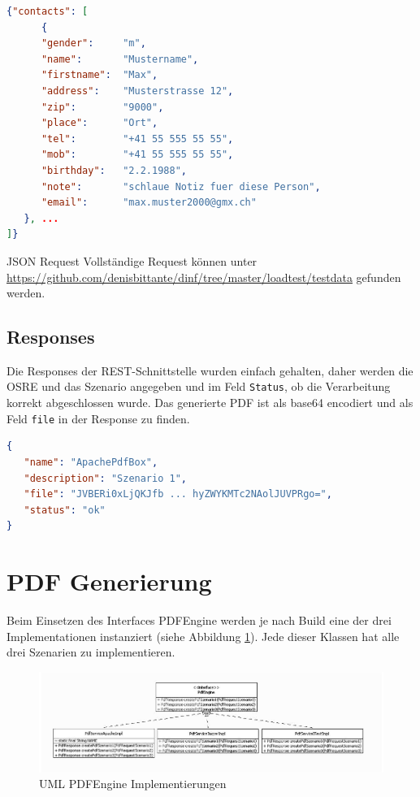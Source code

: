 \documentclass[main.tex]{subfiles}
\begin{document}
\begin{lstlisting}[language=json]
{"contacts": [
      {
      "gender":     "m",
      "name":       "Mustername",
      "firstname":  "Max",
      "address":    "Musterstrasse 12",
      "zip":        "9000",
      "place":      "Ort",
      "tel":        "+41 55 555 55 55",
      "mob":        "+41 55 555 55 55",
      "birthday":   "2.2.1988",
      "note":       "schlaue Notiz fuer diese Person",
      "email":      "max.muster2000@gmx.ch"
   }, ...
]}


\end{lstlisting}

\begin{reference}{JSON Request}
 Vollständige Request können unter \url{https://github.com/denisbittante/dinf/tree/master/loadtest/testdata} gefunden werden.
\end{reference}
 


\subsection{Responses}
Die Responses der REST-Schnittstelle wurden einfach gehalten, daher werden die OSRE und das Szenario angegeben und im Feld \texttt{Status}, ob die Verarbeitung korrekt abgeschlossen wurde. Das generierte PDF ist als base64 encodiert und als Feld \texttt{file} in der Response zu finden. 
\begin{lstlisting}[language=json]
{
   "name": "ApachePdfBox",
   "description": "Szenario 1",
   "file": "JVBERi0xLjQKJfb ... hyZWYKMTc2NAolJUVPRgo=",
   "status": "ok"
}

\end{lstlisting}




\section{PDF Generierung}

Beim Einsetzen des Interfaces PDFEngine werden je nach Build eine der drei Implementationen instanziert (siehe Abbildung \ref{figure:pdfEngineImpl}). Jede dieser Klassen hat alle drei Szenarien zu implementieren.  


\begin{figure}[h]
 
\includegraphics[width=\textwidth ]{pic/uml/PdfEngineImplemntierung.jpg}
 \caption{UML PDFEngine Implementierungen}
 \label{figure:pdfEngineImpl}
\end{figure}
\end{document}
